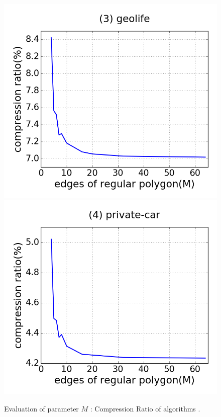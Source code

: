 \begin{figure}[tb!]
\includegraphics[scale = 0.24]{figures/Exp-M-cr-geolife.png}
\includegraphics[scale = 0.24]{figures/Exp-M-cr-private.png}
\vspace{-2ex}
\caption{\small Evaluation of parameter $M$ : Compression Ratio of algorithms \cista.}
\label{fig:m-cr-cista}
\vspace{-1ex}
\end{figure}

